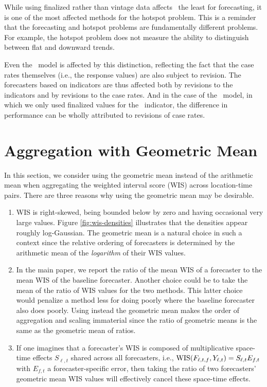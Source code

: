 While using finalized rather than vintage data affects \dv~the least for
forecasting, it is one of the most affected methods for the hotspot problem.
This is a reminder that the forecasting and hotspot problems are fundamentally
different problems.  For example, the hotspot problem does not measure the
ability to distinguish between flat and downward trends.

Even the \ar~model is affected by this distinction, reflecting the fact that the
case rates themselves (i.e., the response values) are also subject to revision.
The forecasters based on indicators are thus affected both by revisions to the
indicators and by revisions to the case rates.  And in the case of the
\gs~model, in which we only used finalized values for the \gs~indicator, the
difference in performance can be wholly attributed to revisions of case rates. 

\section{Aggregation with Geometric Mean}

In this section, we consider using the geometric mean instead of the arithmetic
mean when aggregating the weighted interval score (WIS) across location-time
pairs.  There are three reasons why using the geometric mean may be desirable.
\begin{enumerate}
\item WIS is right-skewed, being bounded below by zero and having occasional 
  very large values.  Figure \ref{fig:wis-densities} illustrates that the
  densities appear roughly log-Gaussian.  The geometric mean is a natural choice  
  in such a context since the relative ordering of forecasters is determined by
  the arithmetic mean of the {\em logarithm} of their WIS values.
\item In the main paper, we report the ratio of the mean WIS of a forecaster to
  the mean WIS of the baseline forecaster. Another choice could be to take the
  mean of the ratio of WIS values for the two methods. This latter choice would
  penalize a method less for doing poorly where the baseline forecaster also
  does poorly.  Using instead the geometric mean makes the order of aggregation
  and scaling immaterial since the ratio of geometric means is the same as the 
  geometric mean of ratios.
\item If one imagines that a forecaster's WIS is composed of multiplicative
  space-time effects $S_{\ell,t}$ shared across all forecasters,
  i.e., $\mathrm{WIS}(F_{\ell,t,f},Y_{\ell,t})=S_{\ell,t}E_{f,t}$ with $E_{f,t}$ a
  forecaster-specific error, then taking the ratio of two forecasters' geometric
  mean WIS values will effectively cancel these space-time effects. 
\end{enumerate}

